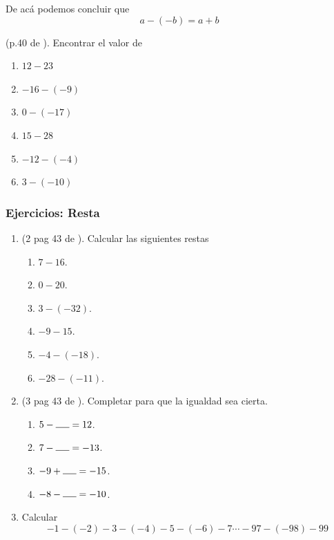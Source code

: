 De acá podemos concluir que 
\[
a-(-b)=a+b
\]

\begin{exer}
	(p.40 de \cite{Dimensions_Math_7A}). Encontrar el valor de 
	\begin{multicols}{3}
		\begin{enumerate}[label=\Alph*)]
			\item $12-23$
			\item $-16-(-9)$
			\item $0-(-17)$
			\item $15-28$
			\item $-12-(-4)$
			\item $3-(-10)$
		\end{enumerate}
	\end{multicols}
\end{exer}

\newpage

\begin{center}
	\vspace{-1cm}
	\subsubsection{Ejercicios: Resta}\label{ejercicios_subsubsection_resta_numeros_reales}
\end{center}
\begin{enumerate}
	\item (2 pag 43 de \cite{Dimensions_Math_7A}). Calcular las siguientes restas
	\begin{multicols}{3}
		\begin{enumerate}[label=\Alph*)]
			\item $7-16$.
			\item $0-20$.
			\item $3-(-32)$.
			\item $-9-15$.
			\item $-4-(-18)$.
			\item $-28-(-11)$.
		\end{enumerate}	
	\end{multicols}
	
	\item (3 pag 43 de \cite{Dimensions_Math_7A}). Completar para que la igualdad sea cierta.
	\begin{multicols}{3}
		\begin{enumerate}[label=\Alph*)]
			\item $5 - \rule{5mm}{0.15mm}= 12$.
			\item $ 7-  \rule{5mm}{0.15mm} = -13$.
			\item $ -9 + \rule{5mm}{0.15mm} = -15$.
			\item $ -8-\rule{5mm}{0.15mm} = -10$.
		\end{enumerate}	
	\end{multicols}
	
	
	\item Calcular
	\[
	-1-(-2)-3-(-4)-5-(-6)-7\cdots - 97-(-98)-99
	\]			
\end{enumerate}
\newpage

